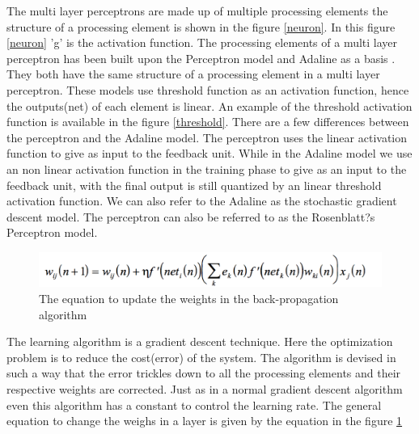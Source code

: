 \documentclass[conference]{IEEEtran}
\begin{document}
The multi layer perceptrons are made up of multiple processing elements the structure of a processing element is shown in the figure \ref{neuron}. In this figure \ref{neuron} 'g' is the activation function. The processing elements of a multi layer perceptron has been built upon the Perceptron model and Adaline as a basis\cite{RosenBlat's Perceptron} \cite{Marlyn Neural Nets} \cite{Gail Neural Nets}. They both have the same structure of a processing element in a multi layer perceptron. These models use threshold function as an activation function, hence the outputs(net) of each element is linear. An example of the threshold activation function is available in the figure \ref{threshold}. There are a few differences between the perceptron and the Adaline model. The perceptron uses the linear activation function to give as input to the feedback unit. While in the Adaline model we use an non linear activation function in the training phase to give as an input to the feedback unit, with the final output is still quantized by an linear threshold activation function. We can also refer to the Adaline as the stochastic gradient descent model. The perceptron can also be referred to as the  Rosenblatt?s Perceptron model.

 \begin{figure}[h!]
\centering
\includegraphics[scale=0.45]{backpropogation}
\caption{The equation to update the weights in the back-propagation algorithm}
\label{backpropagation}
\end{figure}

The learning algorithm is a gradient descent technique. Here the optimization problem is to reduce the cost(error) of the system. The algorithm is devised in such a way that the error trickles down to all the processing elements and their respective weights are corrected. Just as in a normal gradient descent algorithm even this algorithm has a constant to control the learning rate. The general equation to change the weighs in a layer is given by the equation in the figure \ref{backpropagation} 
 
\end{document}
